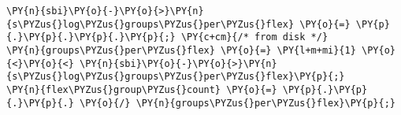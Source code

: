 \begin{Verbatim}[commandchars=\\\{\},codes={\catcode`\$=3\catcode`\^=7\catcode`\_=8}]
\PY{n}{sbi}\PY{o}{-}\PY{o}{>}\PY{n}{s\PYZus{}log\PYZus{}groups\PYZus{}per\PYZus{}flex} \PY{o}{=} \PY{p}{.}\PY{p}{.}\PY{p}{.}\PY{p}{;} \PY{c+cm}{/* from disk */}
\PY{n}{groups\PYZus{}per\PYZus{}flex} \PY{o}{=} \PY{l+m+mi}{1} \PY{o}{<}\PY{o}{<} \PY{n}{sbi}\PY{o}{-}\PY{o}{>}\PY{n}{s\PYZus{}log\PYZus{}groups\PYZus{}per\PYZus{}flex}\PY{p}{;}
\PY{n}{flex\PYZus{}group\PYZus{}count} \PY{o}{=} \PY{p}{.}\PY{p}{.}\PY{p}{.} \PY{o}{/} \PY{n}{groups\PYZus{}per\PYZus{}flex}\PY{p}{;}
\end{Verbatim}
